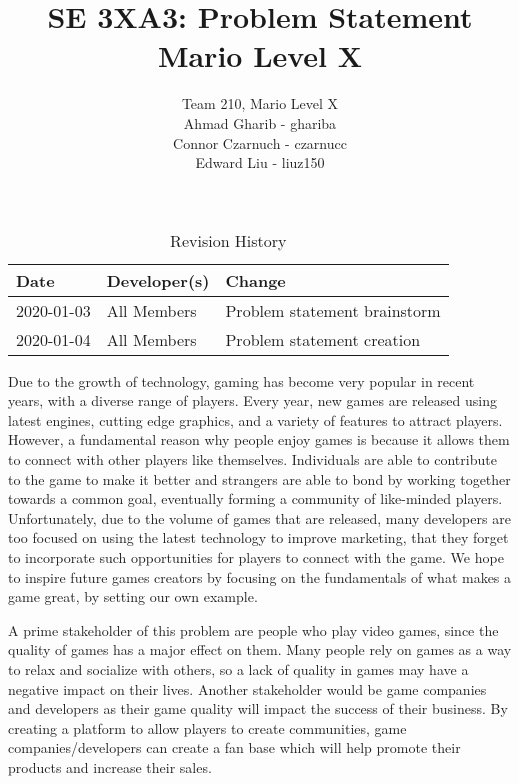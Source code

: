 \documentclass{article}
\title{SE 3XA3: Problem Statement\\Mario Level X}
\author{Team 210, Mario Level X
		\\ Ahmad Gharib - ghariba
		\\ Connor Czarnuch - czarnucc
		\\ Edward Liu - liuz150
}
\date{}
\begin{document}
\begin{table}[hp]
\caption{Revision History} \label{TblRevisionHistory}
\begin{tabularx}{\textwidth}{llX}
\toprule
\textbf{Date} & \textbf{Developer(s)} & \textbf{Change}\\
\midrule
2020-01-03 & All Members & Problem statement brainstorm\\
2020-01-04 & All Members & Problem statement creation\\
\bottomrule
\end{tabularx}
\end{table}

\newpage

\maketitle

\newpage
Due to the growth of technology, gaming has become very popular in recent years, with a diverse range of players. Every year, new games are released using latest engines, cutting edge graphics, and a variety of features to attract players. However, a fundamental reason why people enjoy games is because it allows them to connect with other players like themselves. Individuals are able to contribute to the game to make it better and strangers are able to bond by working together towards a common goal, eventually forming a community of like-minded players. Unfortunately, due to the volume of games that are released, many developers are too focused on using the latest technology to improve marketing, that they forget to incorporate such opportunities for players to connect with the game. We hope to inspire future games creators by focusing on the fundamentals of what makes a game great, by setting our own example.
    \bigskip

    A prime stakeholder of this problem are people who play video games, since the quality of games has a major effect on them. Many people rely on games as a way to relax and socialize with others, so a lack of quality in games may have a negative impact on their lives. Another stakeholder would be game companies and developers as their game quality will impact the success of their business. By creating a platform to allow players to create communities, game companies/developers can create a fan base which will help promote their products and increase their sales.
    \bigskip
    
\end{document}
